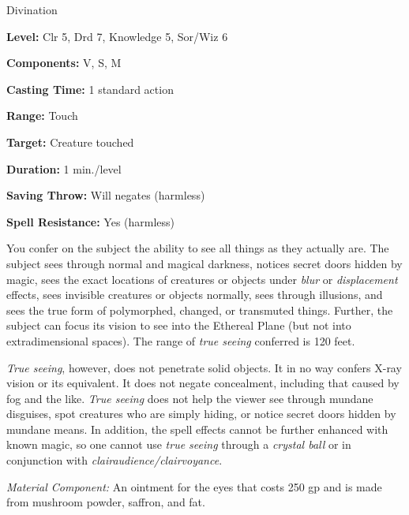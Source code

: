
Divination

\textbf{Level:} Clr 5, Drd 7, Knowledge 5, Sor/Wiz 6

\textbf{Components:} V, S, M

\textbf{Casting Time:} 1 standard action

\textbf{Range:} Touch

\textbf{Target:} Creature touched

\textbf{Duration:} 1 min./level

\textbf{Saving Throw:} Will negates (harmless)

\textbf{Spell Resistance:} Yes (harmless)

You confer on the subject the ability to see all things as they actually are. The 
subject sees through normal and magical darkness, notices secret doors hidden by 
magic, sees the exact locations of creatures or objects under \textit{blur} or 
\textit{displacement} effects, sees invisible creatures or objects normally, sees 
through illusions, and sees the true form of polymorphed, changed, or transmuted 
things. Further, the subject can focus its vision to see into the Ethereal Plane 
(but not into extradimensional spaces). The range of \textit{true seeing} conferred 
is 120 feet.

\textit{True seeing}, however, does not penetrate solid objects. It in no way confers 
X-ray vision or its equivalent. It does not negate concealment, including that 
caused by fog and the like. \textit{True seeing} does not help the viewer see through 
mundane disguises, spot creatures who are simply hiding, or notice secret doors 
hidden by mundane means. In addition, the spell effects cannot be further enhanced 
with known magic, so one cannot use \textit{true seeing} through a \textit{crystal 
ball} or in conjunction with \textit{clairaudience/clairvoyance}.

\textit{Material Component:} An ointment for the eyes that costs 250 gp and is 
made from mushroom powder, saffron, and fat.

